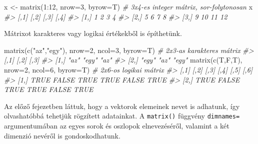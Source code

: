 \documentclass[
]{book}
\newenvironment{Shaded}{\begin{snugshade}}{\end{snugshade}}
\newcommand{\AttributeTok}[1]{\textcolor[rgb]{0.77,0.63,0.00}{#1}}
\newcommand{\CommentTok}[1]{\textcolor[rgb]{0.56,0.35,0.01}{\textit{#1}}}
\newcommand{\DecValTok}[1]{\textcolor[rgb]{0.00,0.00,0.81}{#1}}
\newcommand{\FunctionTok}[1]{\textcolor[rgb]{0.00,0.00,0.00}{#1}}
\newcommand{\NormalTok}[1]{#1}
\newcommand{\OtherTok}[1]{\textcolor[rgb]{0.56,0.35,0.01}{#1}}
\newcommand{\SpecialCharTok}[1]{\textcolor[rgb]{0.00,0.00,0.00}{#1}}
\newcommand{\StringTok}[1]{\textcolor[rgb]{0.31,0.60,0.02}{#1}}
\begin{document}
\begin{Shaded}
\begin{Highlighting}[]
\NormalTok{x }\OtherTok{\textless{}{-}} \FunctionTok{matrix}\NormalTok{(}\DecValTok{1}\SpecialCharTok{:}\DecValTok{12}\NormalTok{, }\AttributeTok{nrow=}\DecValTok{3}\NormalTok{, }\AttributeTok{byrow=}\NormalTok{T)  }\CommentTok{\# 3x4{-}es integer mátrix, sor{-}folytonosan}
\NormalTok{x}
\CommentTok{\#\textgreater{}      [,1] [,2] [,3] [,4]}
\CommentTok{\#\textgreater{} [1,]    1    2    3    4}
\CommentTok{\#\textgreater{} [2,]    5    6    7    8}
\CommentTok{\#\textgreater{} [3,]    9   10   11   12}
\end{Highlighting}
\end{Shaded}

Mátrixot karakteres vagy logikai értékekből is építhetünk.

\begin{Shaded}
\begin{Highlighting}[]
\FunctionTok{matrix}\NormalTok{(}\FunctionTok{c}\NormalTok{(}\StringTok{"az"}\NormalTok{,}\StringTok{"egy"}\NormalTok{), }\AttributeTok{nrow=}\DecValTok{2}\NormalTok{, }\AttributeTok{ncol=}\DecValTok{3}\NormalTok{, }\AttributeTok{byrow=}\NormalTok{T) }\CommentTok{\# 2x3{-}as karakteres mátrix}
\CommentTok{\#\textgreater{}      [,1]  [,2]  [,3] }
\CommentTok{\#\textgreater{} [1,] "az"  "egy" "az" }
\CommentTok{\#\textgreater{} [2,] "egy" "az"  "egy"}
\FunctionTok{matrix}\NormalTok{(}\FunctionTok{c}\NormalTok{(T,F,T), }\AttributeTok{nrow=}\DecValTok{2}\NormalTok{, }\AttributeTok{ncol=}\DecValTok{6}\NormalTok{, }\AttributeTok{byrow=}\NormalTok{T)      }\CommentTok{\# 2x6{-}os logikai mátrix   }
\CommentTok{\#\textgreater{}      [,1]  [,2] [,3] [,4]  [,5] [,6]}
\CommentTok{\#\textgreater{} [1,] TRUE FALSE TRUE TRUE FALSE TRUE}
\CommentTok{\#\textgreater{} [2,] TRUE FALSE TRUE TRUE FALSE TRUE}
\end{Highlighting}
\end{Shaded}

Az előző fejezetben láttuk, hogy a vektorok elemeinek nevet is adhatunk, így olvashatóbbá tehetjük rögzített adatainkat. A \texttt{matrix()} függvény \texttt{dimnames=} argumentumában az egyes sorok és oszlopok elnevezéséről, valamint a két dimenzió nevéről is gondoskodhatunk.
\end{document}
